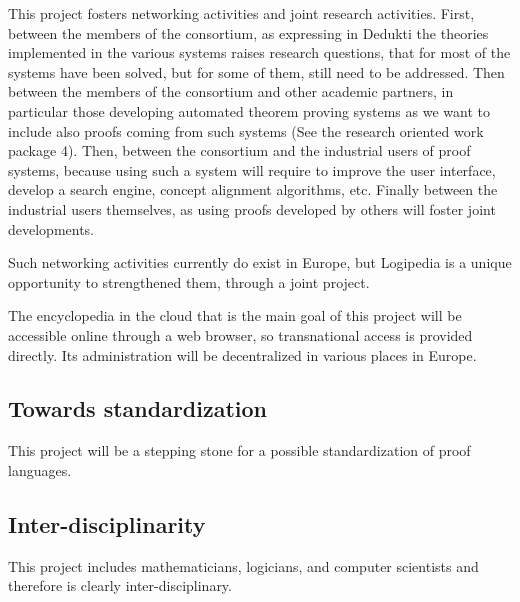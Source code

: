 This project fosters networking activities and joint research
activities. First, between the members of the consortium, as
expressing in {\sc Dedukti} the theories implemented in the various
systems raises research questions, that for most of the systems have
been solved, but for some of them, still need to be addressed.  Then
between the members of the consortium and other academic partners, in
particular those developing automated theorem proving systems as we
want to include also proofs coming from such systems (See the research
oriented work package 4). Then, between the consortium and the
industrial users of proof systems, because using such a system will
require to improve the user interface, develop a search engine,
concept alignment algorithms, etc.  Finally between the industrial
users themselves, as using proofs developed by others will foster joint
developments.

Such networking activities currently do exist in Europe, but {\sc
  Logipedia} is a unique opportunity to strengthened them, through a
joint project.

The encyclopedia in the cloud that is the main goal of this project
will be accessible online through a web browser, so transnational
access is provided directly. Its administration will be decentralized
in various places in Europe.

\subsection{Towards standardization}
This project will be a stepping stone for a possible standardization
of proof languages.

\subsection{Inter-disciplinarity}
This project includes mathematicians, logicians, and computer
scientists and therefore is clearly inter-disciplinary.

 

